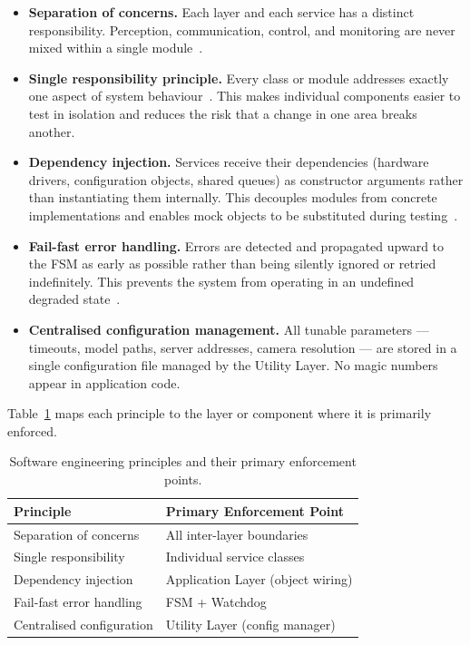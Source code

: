 \begin{itemize}
    \item \textbf{Separation of concerns.} Each layer and each service
          has a distinct responsibility. Perception, communication,
          control, and monitoring are never mixed within a single
          module~\cite{dijkstra1982role}.
 
    \item \textbf{Single responsibility principle.} Every class or
          module addresses exactly one aspect of system
          behaviour~\cite{martin2008clean}. This makes individual
          components easier to test in isolation and reduces the risk
          that a change in one area breaks another.
 
    \item \textbf{Dependency injection.} Services receive their
          dependencies (hardware drivers, configuration objects,
          shared queues) as constructor arguments rather than
          instantiating them internally. This decouples modules from
          concrete implementations and enables mock objects to be
          substituted during testing~\cite{gamma1994design}.
 
    \item \textbf{Fail-fast error handling.} Errors are detected and
          propagated upward to the FSM as early as possible rather
          than being silently ignored or retried indefinitely. This
          prevents the system from operating in an undefined
          degraded state~\cite{martin2008clean}.
 
    \item \textbf{Centralised configuration management.} All tunable
          parameters — timeouts, model paths, server addresses,
          camera resolution — are stored in a single configuration
          file managed by the Utility Layer. No magic numbers appear
          in application code.
\end{itemize}
 
Table~\ref{tab:sw_principles} maps each principle to the layer or
component where it is primarily enforced.
 
\begin{table}[h]
\centering
\caption{Software engineering principles and their primary enforcement points.}
\label{tab:sw_principles}
\begin{tabular}{ll}
\hline
\textbf{Principle} & \textbf{Primary Enforcement Point} \\
\hline
Separation of concerns      & All inter-layer boundaries          \\
Single responsibility       & Individual service classes          \\
Dependency injection        & Application Layer (object wiring)   \\
Fail-fast error handling    & FSM + Watchdog                      \\
Centralised configuration   & Utility Layer (config manager)      \\
\hline
\end{tabular}
\end{table}
 
